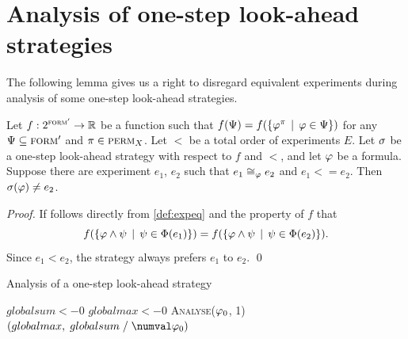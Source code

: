 \section{Analysis of one-step look-ahead strategies}

The following lemma gives us a right to disregard equivalent experiments
  during analysis of some one-step look-ahead strategies.

\begin{lemma}
Let $f: 2^{\textsc{form}'} ->\mathbb{R}$ be a function such that
  $f(\Psi) = f(\{\varphi^\pi \:\:|\:\: \varphi\in\Psi\})$ for any
  $\Psi\subseteq{\textsc{form}'}$ and $\pi\in\textsc{perm}_X$.
Let $<$ be a total order of experiments $E$.
Let $\sigma$ be a one-step look-ahead strategy with respect to $f$ and $<$, and
let $\varphi$ be a formula.
Suppose there are experiment $e_1$, $e_2$ such that $e_1\cong_{\varphi}e_2$ and $e_1<=e_2$.
Then $\sigma(\varphi) \not= e_2$.
\end{lemma}

\begin{proof}
If follows directly from \autoref{def:expeq} and the property of $f$ that
\[f(\{\varphi\wedge\psi\:\:|\:\: \psi\in\Phi(e_1)\}) =
 f(\{\varphi\wedge\psi\:\:|\:\: \psi\in\Phi(e_2)\}).\]
Since $e_1 < e_2$, the strategy always prefers $e_1$ to $e_2$. \qed
\end{proof}

\vspace{-5mm}
\begin{algorithm}[h]
\caption{Analysis of a one-step look-ahead strategy}
\label{alg:stganalysis}
\DontPrintSemicolon
{}
$globalsum <- 0$\;
$globalmax <- 0$\;
\textsc{Analyse}($\varphi_0$, 1)\;
\Return$ (globalmax,\; globalsum \;/\; \numval\init)$\;\medskip
\setcounter{AlgoLine}{0}
\end{algorithm}

